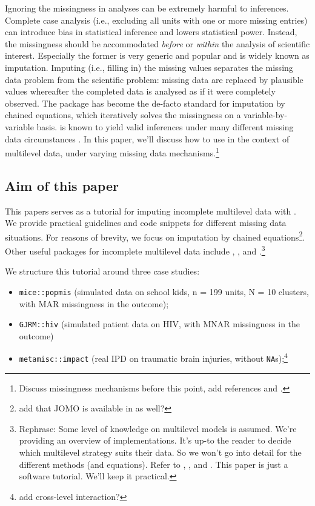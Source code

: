 \documentclass[
]{jss}
\begin{document}
Ignoring the missingness in analyses can be extremely harmful to
inferences. Complete case analysis (i.e., excluding all units with one
or more missing entries) can introduce bias in statistical inference and
lowers statistical power. Instead, the missingness should be
accommodated \emph{before} or \emph{within} the analysis of scientific
interest. Especially the former is very generic and popular and is
widely known as imputation. Imputing (i.e., filling in) the missing
values separates the missing data problem from the scientific problem:
missing data are replaced by plausible values whereafter the completed
data is analysed as if it were completely observed. The 
package  has become the de-facto standard for imputation by
chained equations, which iteratively solves the missingness on a
variable-by-variable basis.  is known to yield valid
inferences under many different missing data circumstances
\citep{buur18}. In this paper, we'll discuss how to use  in
the context of multilevel data, under varying missing data
mechanisms.\footnote{Discuss missingness mechanisms before this point,
  add references \citet{yuce08} and \citet{hox15}.}

\hypertarget{aim-of-this-paper}{%
\subsection{Aim of this paper}\label{aim-of-this-paper}}

This papers serves as a tutorial for imputing incomplete multilevel data
with . We provide practical guidelines and code snippets for
different missing data situations. For reasons of brevity, we focus on
imputation by chained equations\footnote{add that JOMO is available in
   as well?}. Other useful packages for incomplete multilevel
data include , , and .\footnote{Rephrase:
  Some level of knowledge on multilevel models is assumed. We're
  providing an overview of implementations. It's up-to the reader to
  decide which multilevel strategy suits their data. So we won't go into
  detail for the different methods (and equations). Refer to
  \citet{meng94}, \citet{audi18}, and \citet{grun18}. This paper is just
  a software tutorial. We'll keep it practical.}

We structure this tutorial around three case studies:

\begin{itemize}
\item
  \texttt{mice::popmis} (simulated data on school kids, n = 199 units, N
  = 10 clusters, with MAR missingness in the outcome);
\item
  \texttt{GJRM::hiv} (simulated patient data on HIV, with MNAR
  missingness in the outcome)
\item
  \texttt{metamisc::impact} (real IPD on traumatic brain injuries,
  without \texttt{NA}s);\footnote{add cross-level interaction?}
\end{itemize}
\end{document}
